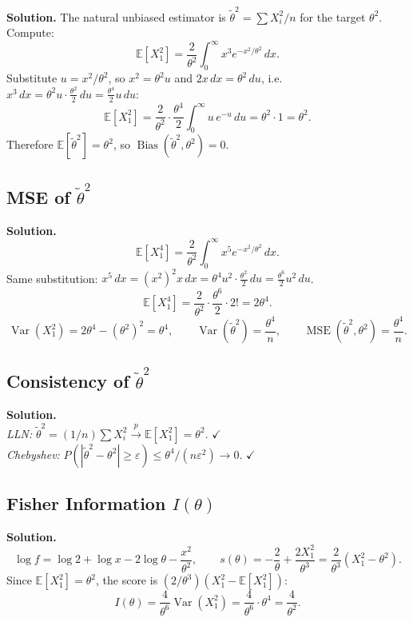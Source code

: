 \documentclass[11pt,a4paper]{article}
\newcommand{\E}{\mathbb{E}}
\newcommand{\Var}{\operatorname{Var}}
\newcommand{\Bias}{\operatorname{Bias}}
\newcommand{\MSE}{\operatorname{MSE}}
\newcommand{\convp}{\xrightarrow{\,p\,}}
\begin{document}
\vspace{120pt}

\textbf{Solution.} The natural unbiased estimator is $\tilde\theta^2 = \sum X_i^2/n$ for the target $\theta^2$. Compute:
\[
  \E[X_1^2] = \frac{2}{\theta^2}\int_0^\infty x^3 e^{-x^2/\theta^2}\,dx.
\]
Substitute $u = x^2/\theta^2$, so $x^2=\theta^2 u$ and $2x\,dx = \theta^2\,du$, i.e.\ $x^3\,dx = \theta^2 u \cdot \frac{\theta^2}{2}\,du = \frac{\theta^4}{2}u\,du$:
\[
  \E[X_1^2] = \frac{2}{\theta^2}\cdot\frac{\theta^4}{2}\int_0^\infty u\,e^{-u}\,du = \theta^2\cdot 1 = \theta^2.
\]
Therefore $\E[\tilde\theta^2] = \theta^2$, so $\Bias(\tilde\theta^2,\theta^2) = 0$.

\subsection{MSE of $\tilde\theta^2$}

\vspace{100pt}

\textbf{Solution.}
\[
  \E[X_1^4] = \frac{2}{\theta^2}\int_0^\infty x^5 e^{-x^2/\theta^2}\,dx.
\]
Same substitution: $x^5\,dx = (x^2)^2 x\,dx = \theta^4u^2\cdot\frac{\theta^2}{2}\,du = \frac{\theta^6}{2}u^2\,du$.
\[
  \E[X_1^4] = \frac{2}{\theta^2}\cdot\frac{\theta^6}{2}\cdot 2! = 2\theta^4.
\]
\[
  \Var(X_1^2) = 2\theta^4 - (\theta^2)^2 = \theta^4, \qquad
  \Var(\tilde\theta^2) = \frac{\theta^4}{n}, \qquad
  \MSE(\tilde\theta^2,\theta^2) = \boxed{\frac{\theta^4}{n}}.
\]

\subsection{Consistency of $\tilde\theta^2$}

\vspace{80pt}

\textbf{Solution.}\\[4pt]
\textit{LLN:} $\tilde\theta^2 = (1/n)\sum X_i^2 \convp \E[X_1^2] = \theta^2$. $\checkmark$\\[4pt]
\textit{Chebyshev:} $P(|\tilde\theta^2-\theta^2|\geq\varepsilon)\leq \theta^4/(n\varepsilon^2)\to 0$. $\checkmark$

\subsection{Fisher Information $I(\theta)$}

\vspace{100pt}

\textbf{Solution.}
\[
  \log f = \log 2 + \log x - 2\log\theta - \frac{x^2}{\theta^2},\qquad
  s(\theta) = -\frac{2}{\theta} + \frac{2X_1^2}{\theta^3} = \frac{2}{\theta^3}(X_1^2 - \theta^2).
\]
Since $\E[X_1^2]=\theta^2$, the score is $(2/\theta^3)(X_1^2 - \E[X_1^2])$:
\[
  I(\theta) = \frac{4}{\theta^6}\Var(X_1^2) = \frac{4}{\theta^6}\cdot\theta^4 = \frac{4}{\theta^2}.
\]
\end{document}

